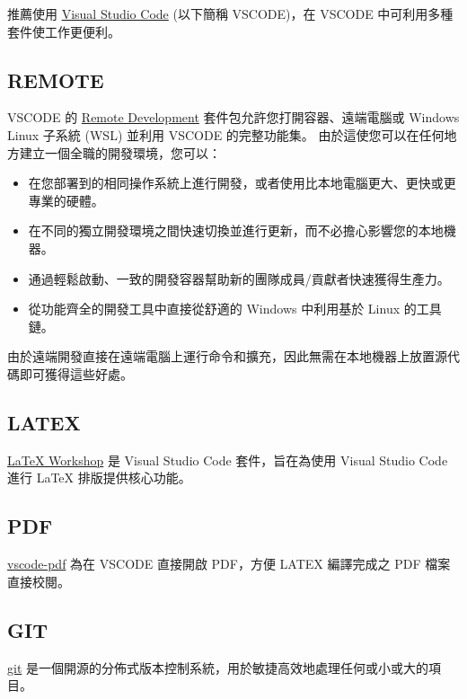 推薦使用 \href{https://code.visualstudio.com/}{Visual Studio Code} (以下簡稱 VSCODE)，在 VSCODE 中可利用多種套件使工作更便利。

\subsection{REMOTE}

VSCODE 的 \href{https://marketplace.visualstudio.com/items?itemName=ms-vscode-remote.vscode-remote-extensionpack}{Remote Development} 套件包允許您打開容器、遠端電腦或 Windows Linux 子系統 (WSL) 並利用 VSCODE 的完整功能集。 由於這使您可以在任何地方建立一個全職的開發環境，您可以：

\begin{itemize}
    \item    在您部署到的相同操作系統上進行開發，或者使用比本地電腦更大、更快或更專業的硬體。
    \item    在不同的獨立開發環境之間快速切換並進行更新，而不必擔心影響您的本地機器。
    \item    通過輕鬆啟動、一致的開發容器幫助新的團隊成員/貢獻者快速獲得生產力。
    \item    從功能齊全的開發工具中直接從舒適的 Windows 中利用基於 Linux 的工具鏈。
\end{itemize}

由於遠端開發直接在遠端電腦上運行命令和擴充，因此無需在本地機器上放置源代碼即可獲得這些好處。 


\subsection{LATEX}\label{latex_workshop}
\href{https://marketplace.visualstudio.com/items?itemName=James-Yu.latex-workshop}{LaTeX Workshop} 是 Visual Studio Code 套件，旨在為使用 Visual Studio Code 進行 LaTeX 排版提供核心功能。 

\subsection{PDF}

\href{https://marketplace.visualstudio.com/items?itemName=tomoki1207.pdf}{vscode-pdf} 為在 VSCODE 直接開啟 PDF，方便 LATEX 編譯完成之 PDF 檔案直接校閱。

\subsection{GIT}

\href{https://git-scm.com/}{git} 是一個開源的分佈式版本控制系統，用於敏捷高效地處理任何或小或大的項目。

